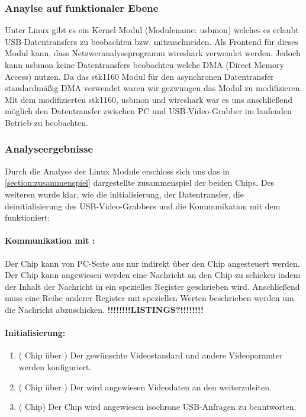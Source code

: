 \subsubsection{Anaylse auf funktionaler Ebene}
Unter Linux gibt es ein Kernel Modul (Modulename: usbmon) welches es erlaubt USB-Datentransfers zu beobachten bzw. 
mitzuschneiden. Als Frontend für dieses Modul kann, dass Netzweranalyseprogramm wireshark verwendet werden. 
Jedoch kann usbmon keine Datentransfers beobachten welche DMA (Direct Memory Access) nutzen. Da das stk1160 Modul für den 
asynchronen Datentransfer standardmäßig DMA verwendet waren wir gezwungen das Modul zu modifizieren.
Mit dem modifizierten stk1160, usbmon und wireshark war es uns anschließend möglich den Datentransfer zwischen PC
und USB-Video-Grabber im laufenden Betrieb zu beobachten.

\subsubsection{Analyseergebnisse}
Durch die Analyse der Linux Module erschloss sich uns das in \autoref{section:zusammenspiel} dargestellte zusammenspiel der
beiden Chips. Des weiteren wurde klar, wie die initialisierung, der Datentransfer, die deinitialisierung des
USB-Video-Grabbers und die Kommunikation mit dem \saa{} funktioniert:

\paragraph{Kommunikation mit \saa{}:} Der \saa{} Chip kann von PC-Seite aus nur indirekt über den \stk{} Chip angesteuert werden.
Der \stk{} Chip kann angewiesen werden eine \iic{} Nachricht an den \saa{} Chip zu schicken indem der Inhalt der Nachricht in ein
spezielles Register geschrieben wird. Anschließend muss eine Reihe anderer Register mit speziellen Werten beschrieben werden um
die Nachricht abzuschicken. \textbf{!!!!!!!!LISTINGS?!!!!!!!!}

\paragraph{Initialisierung:}
\begin{enumerate}
 \item (\saa{} Chip über \iic{}) Der gewünschte Videostandard und andere Videoparamter werden konfiguriert.
 \item (\saa{} Chip über \iic{}) Der \saa{} wird angewiesen Videodaten an den \stk{} weiterzuleiten.
 \item (\stk{} Chip) Der Chip wird angewiesen isochrone USB-Anfragen zu beantworten.
\end{enumerate}

